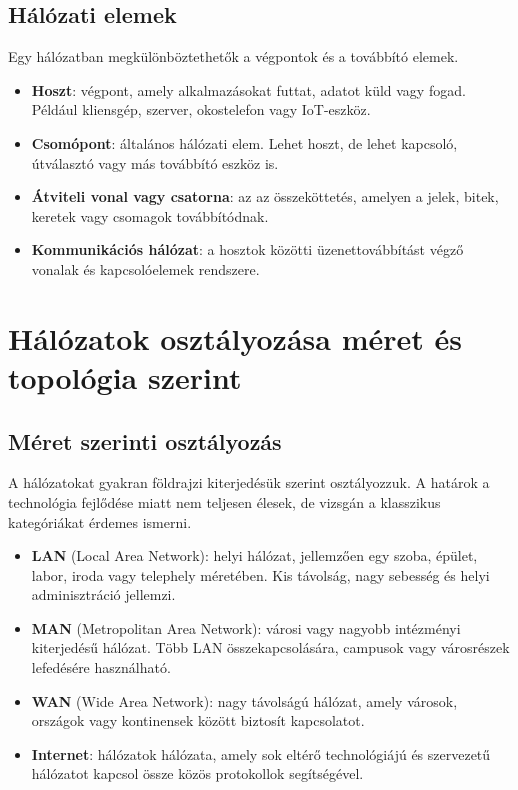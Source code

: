 \subsection{Hálózati elemek}

Egy hálózatban megkülönböztethetők a végpontok és a továbbító elemek.

\begin{itemize}
  \item \textbf{Hoszt}: végpont, amely alkalmazásokat futtat, adatot küld vagy fogad. Például kliensgép, szerver, okostelefon vagy IoT-eszköz.
  \item \textbf{Csomópont}: általános hálózati elem. Lehet hoszt, de lehet kapcsoló, útválasztó vagy más továbbító eszköz is.
  \item \textbf{Átviteli vonal vagy csatorna}: az az összeköttetés, amelyen a jelek, bitek, keretek vagy csomagok továbbítódnak.
  \item \textbf{Kommunikációs hálózat}: a hosztok közötti üzenettovábbítást végző vonalak és kapcsolóelemek rendszere.
\end{itemize}

\begin{center}

\end{center}

\section{Hálózatok osztályozása méret és topológia szerint}

\subsection{Méret szerinti osztályozás}

A hálózatokat gyakran földrajzi kiterjedésük szerint osztályozzuk. A határok a technológia fejlődése miatt nem teljesen élesek, de vizsgán a klasszikus kategóriákat érdemes ismerni.

\begin{itemize}
  \item \textbf{LAN} (Local Area Network): helyi hálózat, jellemzően egy szoba, épület, labor, iroda vagy telephely méretében. Kis távolság, nagy sebesség és helyi adminisztráció jellemzi.
  \item \textbf{MAN} (Metropolitan Area Network): városi vagy nagyobb intézményi kiterjedésű hálózat. Több LAN összekapcsolására, campusok vagy városrészek lefedésére használható.
  \item \textbf{WAN} (Wide Area Network): nagy távolságú hálózat, amely városok, országok vagy kontinensek között biztosít kapcsolatot.
  \item \textbf{Internet}: hálózatok hálózata, amely sok eltérő technológiájú és szervezetű hálózatot kapcsol össze közös protokollok segítségével.
\end{itemize}

